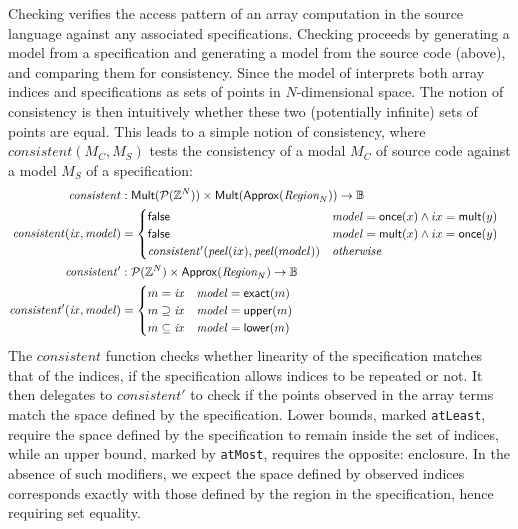 \noindent
Checking verifies the access pattern of an array computation in the
source language against any associated specifications. Checking
proceeds by generating a model from a specification and generating a
model from the source code (above), and comparing them for
consistency.  Since the model of  interprets both
array indices and specifications as sets of points in $N$-dimensional
space. The notion of consistency is then intuitively whether these two
(potentially infinite) sets of points are equal. This leads to a
simple notion of consistency, where $\mathit{consistent}(M_C, M_S)$
tests the consistency of a modal $M_C$ of source code against
a model $M_S$ of a specification:
%
\begin{align*}
  \mathit{consistent} & :
    \mathsf{Mult}(\mathcal{P}(\bz{}^N)) \times
    \mathsf{Mult}(\mathsf{Approx}(\region{N})) \to \mathbb{B} & \\
%
  \mathit{consistent}(\mathit{ix}, \mathit{model}) & = \begin{cases}
    \mathsf{false} & \mathit{model} = \mathsf{once}(x) \wedge ix =
    \mathsf{mult}(y) \\
    \mathsf{false} & \mathit{model} = \mathsf{mult}(x) \wedge ix = \mathsf{once}(y) \\
    \mathit{consistent'}(\mathit{peel}(ix), \mathit{peel}(model)) & \textit{otherwise}
  \end{cases} \\
%
  \mathit{consistent'} & :
    \mathcal{P}(\bz{}^N) \times
    \mathsf{Approx}(\region{N}) \to \mathbb{B} & \\
%
  \mathit{consistent'}(\mathit{ix}, \mathit{model}) & = \begin{cases}
    m = \mathit{ix} & \mathit{model} = \mathsf{exact}(m) \\
    m \supseteq \mathit{ix} & \mathit{model} = \mathsf{upper}(m) \\
    m \subseteq \mathit{ix} & \mathit{model} = \mathsf{lower}(m)
  \end{cases}
\end{align*}
%
The $\mathit{consistent}$ function checks whether linearity of the
specification matches that of the indices, \ie{} if the specification allows
indices to be repeated or not. It then delegates to $\mathit{consistent'}$
to check if the points observed in the array terms match the space
defined by the specification. Lower bounds, marked \texttt{atLeast},
require the space defined by the specification to remain inside the
set of indices, while an upper bound, marked by \texttt{atMost},
requires the opposite: enclosure. In the absence of such modifiers, we expect
the space defined by observed indices corresponds exactly with those defined by the
region in the specification, hence requiring set equality.

